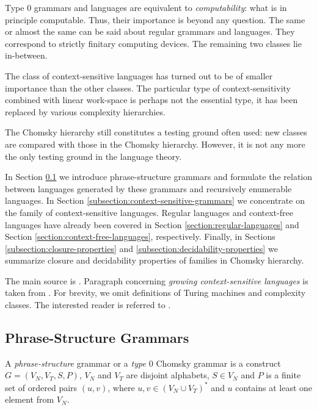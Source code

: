 Type $0$ grammars and languages are equivalent to \emph{computability}: what is in principle computable. Thus, their importance is beyond any question. The same or almost the same can be said about regular grammars and languages. They correspond to strictly finitary computing devices. The remaining two classes lie in-between.

The class of context-sensitive languages has turned out to be of smaller importance than the other classes. The particular type of context-sensitivity combined with linear work-space is perhaps not the essential type, it has been replaced by various complexity hierarchies.

The Chomsky hierarchy still constitutes a testing ground often used: new classes are compared with those in the Chomsky hierarchy. However, it is not any more the only testing ground in the language theory.

In Section \ref{subsection:phrase-structure-grammars} we introduce phrase-structure grammars and formulate the relation between languages generated by these grammars and recursively enumerable languages. In Section \ref{subsection:context-sensitive-grammars} we concentrate on the family of context-sensitive languages. Regular languages and context-free languages have already been covered in Section \ref{section:regular-languages} and Section \ref{section:context-free-languages}, respectively. Finally, in Sections \ref{subsection:closure-properties} and \ref{subsection:decidability-properties} we summarize closure and decidability properties of families in Chomsky hierarchy.

The main source is \citep{RozSal97I}. Paragraph concerning \emph{growing context-sensitive
languages} is taken from \citep{Buntrock19981}. For brevity, we omit definitions of Turing machines and complexity classes. The interested reader is referred to \citep{MaSa1997aspects}.

\subsection{Phrase-Structure Grammars}
\label{subsection:phrase-structure-grammars}

A \emph{phrase-structure} grammar or a \emph{type $0$} Chomsky grammar is a construct $G = (V_N, V_T, S, P)$, $V_N$ and $V_T$ are disjoint alphabets, $S \in V_N$ and $P$ is a finite set of ordered pairs $(u, v)$, where $u, v \in (V_N \cup V_T)^*$ and $u$ contains at least one element from $V_N$.

